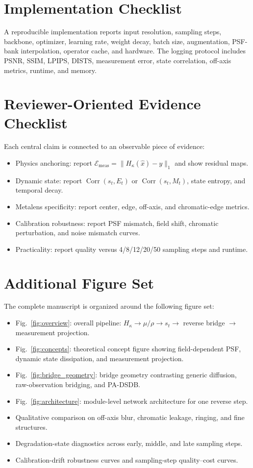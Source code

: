 \documentclass[journal]{IEEEtran}
\newcommand{\Corr}{\operatorname{Corr}}
\newcommand{\hk}{H_{\kappa}}
\begin{document}
\appendices
\section{Implementation Checklist}
A reproducible implementation reports input resolution, sampling steps, backbone, optimizer, learning rate, weight decay, batch size, augmentation, PSF-bank interpolation, operator cache, and hardware. The logging protocol includes PSNR, SSIM, LPIPS, DISTS, measurement error, state correlation, off-axis metrics, runtime, and memory.

\section{Reviewer-Oriented Evidence Checklist}
Each central claim is connected to an observable piece of evidence:
\begin{itemize}
    \item Physics anchoring: report $\mathcal{E}_{\mathrm{meas}}=\|\hk(\hat x)-y\|_1$ and show residual maps.
    \item Dynamic state: report $\Corr(s_t,E_t)$ or $\Corr(s_t,M_t)$, state entropy, and temporal decay.
    \item Metalens specificity: report center, edge, off-axis, and chromatic-edge metrics.
    \item Calibration robustness: report PSF mismatch, field shift, chromatic perturbation, and noise mismatch curves.
    \item Practicality: report quality versus 4/8/12/20/50 sampling steps and runtime.
\end{itemize}

\section{Additional Figure Set}
The complete manuscript is organized around the following figure set:
\begin{itemize}
    \item Fig.~\ref{fig:overview}: overall pipeline: $\hk \rightarrow \mu/\rho \rightarrow s_t \rightarrow$ reverse bridge $\rightarrow$ measurement projection.
    \item Fig.~\ref{fig:concepts}: theoretical concept figure showing field-dependent PSF, dynamic state dissipation, and measurement projection.
    \item Fig.~\ref{fig:bridge_geometry}: bridge geometry contrasting generic diffusion, raw-observation bridging, and PA-DSDB.
    \item Fig.~\ref{fig:architecture}: module-level network architecture for one reverse step.
    \item Qualitative comparison on off-axis blur, chromatic leakage, ringing, and fine structures.
    \item Degradation-state diagnostics across early, middle, and late sampling steps.
    \item Calibration-drift robustness curves and sampling-step quality--cost curves.
\end{itemize}



\end{document}
